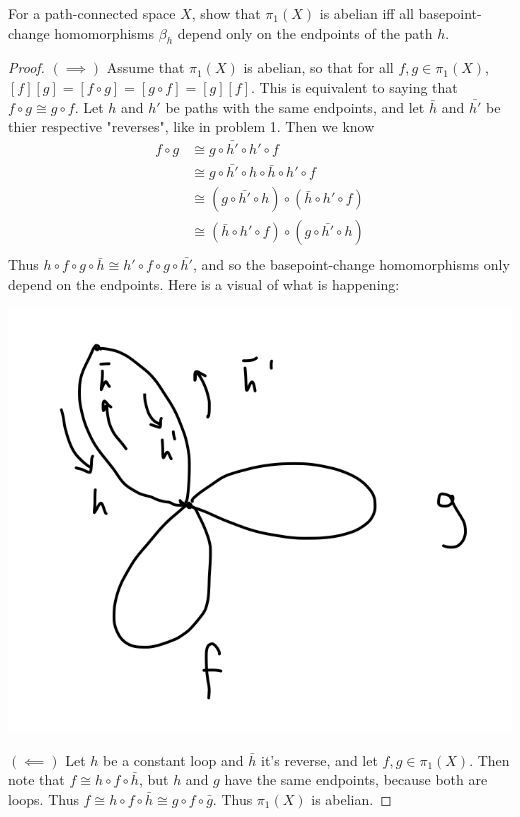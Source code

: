\documentclass[12pt]{article}
\newenvironment{statement}[2][Statement]{\begin{trivlist}
\item[\hskip \labelsep {\bfseries #1}\hskip \labelsep {\bfseries #2.}]}{\end{trivlist}}
\begin{document}
\begin{statement}[Problem]{3}
  For a path-connected space $X$, show that $\pi_1(X)$ is abelian iff all basepoint-change homomorphisms $\beta_h$ depend only
  on the endpoints of the path $h$.
\end{statement}
\begin{proof}
  $( \implies )$ Assume that $\pi_1(X)$ is abelian, so that for all $f,g \in \pi_1(X)$, $[f][g]=[f \circ g]=[g \circ f]=[g][f]$. 
  This is equivalent to saying that $f \circ g \cong g \circ f$. Let $h$ and $h'$ be paths with the same endpoints, and
  let $\bar{h}$ and $\bar{h'}$ be thier respective "reverses", like in problem 1. Then we know
  \begin{align*}
    f \circ g & \cong g \circ \bar{h'} \circ h' \circ f \\
          & \cong g \circ \bar{h'} \circ h \circ \bar{h} \circ h' \circ f \\
          & \cong ( g \circ \bar{h'} \circ h ) \circ ( \bar{h} \circ h' \circ f ) \\
          & \cong ( \bar{h} \circ h' \circ f ) \circ ( g \circ \bar{h'} \circ h ) \\
  \end{align*}
  Thus $h \circ f \circ g \circ \bar{h} \cong h' \circ f \circ g \circ \bar{h'}$, and so the basepoint-change homomorphisms
  only depend on the endpoints. Here is a visual of what is happening:
  \begin{center} \includegraphics[scale=.3]{3.jpg} \end{center}
  \par $( \impliedby )$ Let $h$ be a constant loop and $\bar{h}$ it's reverse, and let $f,g \in \pi_1(X)$. Then note that $f \cong h \circ f \circ \bar{h}$, 
  but $h$ and $g$ have the same endpoints, because both are loops. Thus $f \cong h \circ f \circ \bar{h} \cong g \circ f \circ \bar{g}$. 
  Thus $\pi_1(X)$ is abelian. 
\end{proof}
\end{document}
